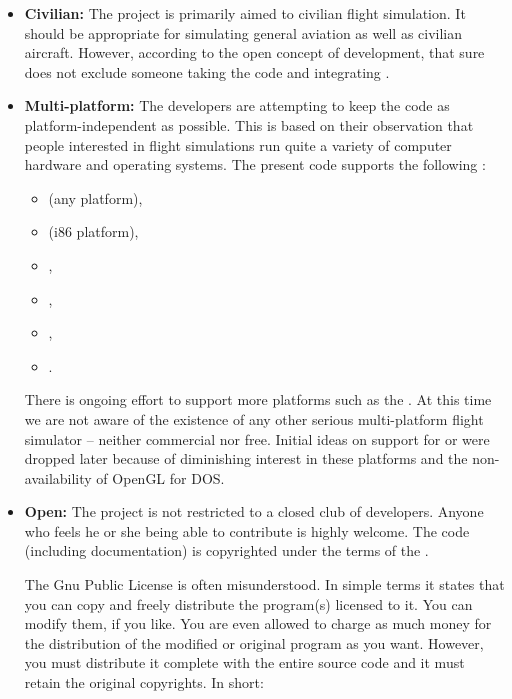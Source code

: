 \begin{itemize}
 \item \textbf{Civilian:} The \FlightGear
 project is primarily aimed to civilian flight simulation.
 It should be appropriate for simulating
 general aviation as well as civilian aircraft. However, according to
 the open concept of development, that sure does not exclude someone
 taking the code and integrating .

 \item\textbf{Multi-platform:} The
 developers are attempting to keep the code as platform-independent
 as possible. This is based on their observation that
 people interested in flight simulations run quite
  a variety of computer hardware and operating systems. The present code
  supports the following :
  \begin{itemize}
  \item{} (any platform),
  \item{} (i86 platform),
  \item{},
  \item{},
  \item{},
  \item{}.
  \end{itemize}

  There is ongoing effort to support more platforms such as the
  . At this time we are not aware of the existence of any other
  serious multi-platform flight simulator -- neither commercial nor free.
  Initial ideas on support for  or  were dropped later because of
  diminishing interest in these platforms and the non-availability of OpenGL for DOS.

  \item\textbf{Open:} The project is not
  restricted to a closed club of developers. Anyone who feels he or she
  being able to contribute is highly welcome.
  The code (including documentation) is copyrighted under the
  terms of the .

  The Gnu Public License is often misunderstood. In simple terms it
  states that you can copy and freely distribute the program(s) licensed
  to it. You can modify them, if you like. You are even allowed to charge
  as much money for the distribution of the modified or original program as you want.
  However, you must distribute it complete with the entire source code
  and it must retain the original copyrights. In short:
\medskip


\end{itemize}
